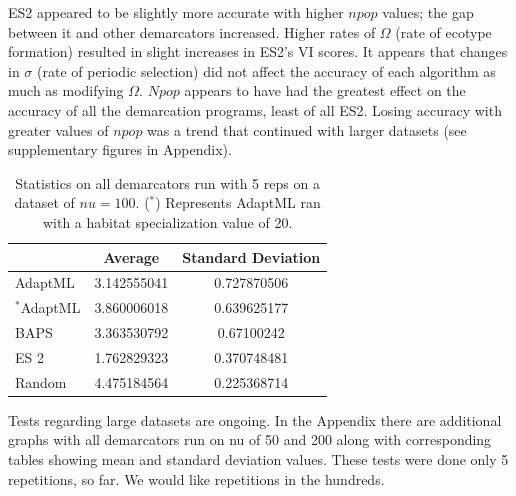 ES2 appeared to be slightly more accurate with higher $npop$ values; the gap between it and other demarcators increased.
Higher rates of $\Omega$ (rate of ecotype formation) resulted in slight increases in ES2's VI scores.
It appears that changes in $\sigma$ (rate of periodic selection) did not affect the accuracy of each algorithm as much as modifying $\Omega$.
$Npop$ appears to have had the greatest effect on the accuracy of all the demarcation programs, least of all ES2.
Losing accuracy with greater values of $npop$ was a trend that continued with larger datasets (see supplementary figures in Appendix).

\begin{table}[h!]
    \begin{tabular}{l|cc}
    ~                    & Average     & Standard Deviation \\ \hline
    AdaptML              & 3.142555041 & 0.727870506        \\
    $^\ast$AdaptML              & 3.860006018 & 0.639625177        \\
    BAPS                 & 3.363530792 & 0.67100242         \\
    ES 2 & 1.762829323 & 0.370748481        \\
    Random               & 4.475184564 & 0.225368714        \\
    \end{tabular}
    \caption[Statistics on all demarcators on $nu=100$.]{Statistics on all demarcators run with 5 reps on a dataset of $nu=100$. ($^\ast$) Represents AdaptML ran with a habitat specialization value of 20. }
        \label{tab:100Allmean}
\end{table}

Tests regarding large datasets are ongoing.
In the Appendix there are additional graphs with all demarcators run on nu of 50 and 200 along with corresponding tables showing mean and standard deviation values.
These tests were done only 5 repetitions, so far.
We would like repetitions in the hundreds.

